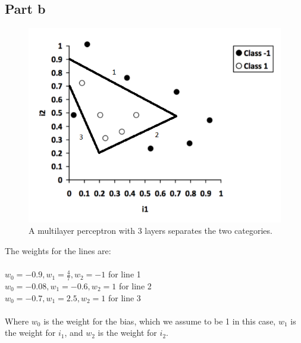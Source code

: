 \documentclass[12pt]{article}
\begin{document}
\subsection*{Part b}

\begin{figure}[H]
    \centering
    \includegraphics[width=1\textwidth]{question_5_plot_b}
    \caption{A multilayer perceptron with 3 layers separates the two categories.}
    \label{fig:question_5_plot_b}
\end{figure}

The weights for the lines are:
\\
\\
$w_0 = -0.9, w_1 = \frac{4}{7}, w_2 = -1$ for line 1 
\\
$w_0 = -0.08, w_1 = -0.6, w_2 = 1$ for line 2
\\
$w_0 = -0.7, w_1 = 2.5, w_2 = 1$ for line 3
\\
\\
Where $w_0$ is the weight for the bias, which we assume to be 1 in this case, $w_1$ is the weight for $i_1$, and $w_2$ is the weight for $i_2$.
\end{document}
